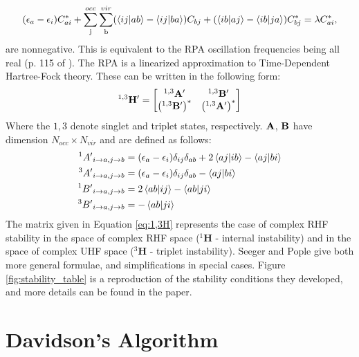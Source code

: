 \documentclass{revtex4}
\begin{document}
\begin{equation}
(\epsilon_a-\epsilon_i)C_{ai}^* + \sum\limits_{\text{j}}^{occ}\sum\limits_{\text{b}}^{vir}
	(\braket{ij|ab}-\braket{ij|ba})C_{bj}
	+(\braket{ib|aj}-\braket{ib|ja})C_{bj}^*
	=\lambda C_{ai}^*,
\end{equation}
are nonnegative. This is equivalent to the RPA oscillation frequencies being all real (p. 115 of \cite{Thouless1972}). The RPA is a linearized approximation to Time-Dependent Hartree-Fock theory. These can be written\cite{Dunning1967}\cite{Seeger1977} in the following form:
\begin{equation}\label{eq:1,3H}
{}^{1,3}\bf{H'}=
\begin{bmatrix}
{}^{1,3}\bf{A'} & {}^{1,3}\bf{B'} \\
\left({}^{1,3}\bf{B'}\right)^* & \left({}^{1,3}\bf{A'}\right)^* \\
\end{bmatrix}
\end{equation}
Where the $1,3$ denote singlet and triplet states, respectively. $\bf{A}$, $\bf{B}$ have dimension $N_{occ}\times N_{vir}$ and are defined as follows:
\begin{subequations}
	\begin{align}
	{}^{1}{A'}_{i\rightarrow a, j\rightarrow b} &= (\epsilon_a-\epsilon_i)\delta_{ij}\delta_{ab} + 2\braket{aj|ib}-\braket{aj|bi}\\
	{}^{3}{A'}_{i\rightarrow a, j\rightarrow b} &= (\epsilon_a-\epsilon_i)\delta_{ij}\delta_{ab} - \braket{aj|bi}\\
	{}^{1}{B'}_{i\rightarrow a, j\rightarrow b} &= 2\braket{ab|ij}-\braket{ab|ji}\\
	{}^{3}{B'}_{i\rightarrow a, j\rightarrow b} &= -\braket{ab|ji}
	\end{align}
\end{subequations}
The matrix given in Equation \ref{eq:1,3H} represents the case of complex RHF stability in the space of complex RHF space (${}^{1}\mathbf{H}$ - internal instability) and in the space of complex UHF space (${}^{3}\mathbf{H}$ - triplet instability). Seeger and Pople \cite{Seeger1977} give both more general formulae, and simplifications in special cases. Figure \ref{fig:stability_table} is a reproduction of the stability conditions they developed, and more details can be found in the paper. 


\section{Davidson's Algorithm}
\end{document}
